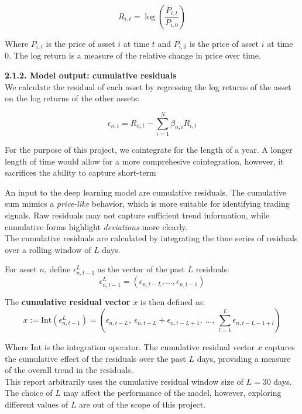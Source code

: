 \documentclass[12pt]{article}
\begin{document}
\[
R_{i,t} = \log\left( \frac{P_{i,t}}{P_{i,0}} \right)
\]

Where $P_{i,t}$ is the price of asset $i$ at time $t$ and $P_{i,0}$ is the price of asset $i$ at time $0$. The log return is a measure of the relative change in price over time.

\vspace{20pt}

\textbf{2.1.2. Model output: cumulative residuals}
\\
We calculate the residual of each asset by regressing the log returns of the asset on the log returns of the other assets:

\[
\epsilon_{n,t} = R_{n,t} - \sum_{i=1}^{N} \beta_{n,i} R_{i,t}
\]

For the purpose of this project, we cointegrate for the length of a year. A longer length of time would allow for a more comprehesive cointegration, however, it sacrifices the ability to capture short-term 

An input to the deep learning model are cumulative residuals. 
The cumulative sum mimics a \textit{price-like} behavior, which is more suitable for identifying trading signals. Raw residuals may not capture sufficient trend information, while cumulative forms highlight \textit{deviations} more clearly.
\\
The cumulative residuals are calculated by integrating the time series of residuals over a rolling window of $L$ days.

For asset $n$, define $\epsilon^L_{n,t-1}$ as the vector of the past $L$ residuals:
\[
\epsilon^L_{n,t-1} = (\epsilon_{n,t-L}, \ldots, \epsilon_{n,t-1})
\]

The \textbf{cumulative residual vector} $x$ is then defined as:
\[
x := \mathrm{Int}(\epsilon^L_{n,t-1}) = \left( \epsilon_{n,t-L},\ \epsilon_{n,t-L} + \epsilon_{n,t-L+1},\ \ldots,\ \sum_{l=1}^{L} \epsilon_{n,t-L-1+l} \right)
\]

Where $\mathrm{Int}$ is the integration operator. The cumulative residual vector $x$ captures the cumulative effect of the residuals over the past $L$ days, providing a measure of the overall trend in the residuals.
\\

This report arbitrarily uses the cumulative residual window size of $L=30$ days. The choice of $L$ may affect the performance of the model, however, exploring different values of $L$ are out of the scope of this project.

\vspace{20pt}
\end{document}

